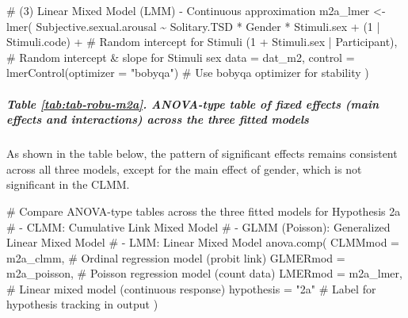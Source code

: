 \documentclass[
  bookmarksnumbered]{article}
\newenvironment{Shaded}{\begin{snugshade}}{\end{snugshade}}
\newcommand{\AttributeTok}[1]{\textcolor[rgb]{0.80,0.80,0.80}{#1}}
\newcommand{\CommentTok}[1]{\textcolor[rgb]{0.50,0.62,0.50}{#1}}
\newcommand{\DecValTok}[1]{\textcolor[rgb]{0.86,0.86,0.80}{#1}}
\newcommand{\FunctionTok}[1]{\textcolor[rgb]{0.94,0.94,0.56}{#1}}
\newcommand{\NormalTok}[1]{\textcolor[rgb]{0.80,0.80,0.80}{#1}}
\newcommand{\OtherTok}[1]{\textcolor[rgb]{0.94,0.94,0.56}{#1}}
\newcommand{\SpecialCharTok}[1]{\textcolor[rgb]{0.86,0.64,0.64}{#1}}
\newcommand{\StringTok}[1]{\textcolor[rgb]{0.80,0.58,0.58}{#1}}
\begin{document}
\begin{Shaded}
\begin{Highlighting}[]
\CommentTok{\# (3) Linear Mixed Model (LMM) {-} Continuous approximation}
\NormalTok{m2a\_lmer }\OtherTok{\textless{}{-}} \FunctionTok{lmer}\NormalTok{(}
\NormalTok{  Subjective.sexual.arousal }\SpecialCharTok{\textasciitilde{}}\NormalTok{ Solitary.TSD }\SpecialCharTok{*}\NormalTok{ Gender }\SpecialCharTok{*}\NormalTok{ Stimuli.sex }\SpecialCharTok{+}
\NormalTok{    (}\DecValTok{1} \SpecialCharTok{|}\NormalTok{ Stimuli.code) }\SpecialCharTok{+} \CommentTok{\# Random intercept for Stimuli}
\NormalTok{    (}\DecValTok{1} \SpecialCharTok{+}\NormalTok{ Stimuli.sex }\SpecialCharTok{|}\NormalTok{ Participant), }\CommentTok{\# Random intercept \& slope for Stimuli sex}
  \AttributeTok{data =}\NormalTok{ dat\_m2,}
  \AttributeTok{control =} \FunctionTok{lmerControl}\NormalTok{(}\AttributeTok{optimizer =} \StringTok{"bobyqa"}\NormalTok{) }\CommentTok{\# Use \textquotesingle{}bobyqa\textquotesingle{} optimizer for stability}
\NormalTok{)}
\end{Highlighting}
\end{Shaded}

\subparagraph{Table \ref{tab:tab-robu-m2a}. ANOVA-type table of fixed effects (main effects and interactions) across the three fitted models}\label{table-reftabtab-robu-m2a.-anova-type-table-of-fixed-effects-main-effects-and-interactions-across-the-three-fitted-models}

As shown in the table below, the pattern of significant effects remains consistent across all three models, except for the main effect of gender, which is not significant in the CLMM.

\begin{Shaded}
\begin{Highlighting}[]
\CommentTok{\# Compare ANOVA{-}type tables across the three fitted models for Hypothesis 2a}
\CommentTok{\# {-} CLMM: Cumulative Link Mixed Model}
\CommentTok{\# {-} GLMM (Poisson): Generalized Linear Mixed Model}
\CommentTok{\# {-} LMM: Linear Mixed Model}
\FunctionTok{anova.comp}\NormalTok{(}
  \AttributeTok{CLMMmod =}\NormalTok{ m2a\_clmm, }\CommentTok{\# Ordinal regression model (probit link)}
  \AttributeTok{GLMERmod =}\NormalTok{ m2a\_poisson, }\CommentTok{\# Poisson regression model (count data)}
  \AttributeTok{LMERmod =}\NormalTok{ m2a\_lmer, }\CommentTok{\# Linear mixed model (continuous response)}
  \AttributeTok{hypothesis =} \StringTok{"2a"} \CommentTok{\# Label for hypothesis tracking in output}
\NormalTok{)}
\end{Highlighting}
\end{Shaded}
\end{document}

